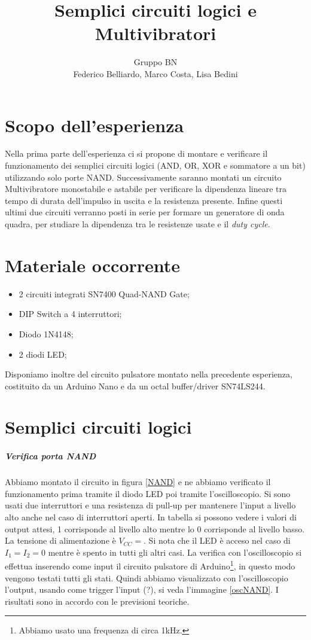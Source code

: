 \documentclass[10pt,a4paper]{article}
\author{Gruppo BN \\ Federico Belliardo, Marco Costa, Lisa Bedini}
\title{Semplici circuiti logici e Multivibratori}
\begin{document}
\maketitle
\section{Scopo dell'esperienza}
Nella prima parte dell'esperienza ci si propone di montare e verificare il funzionamento dei semplici circuiti logici (AND, OR, XOR e sommatore a un bit) utilizzando solo porte NAND. Successivamente saranno montati un circuito Multivibratore monostabile e astabile per verificare la dipendenza lineare tra tempo di durata dell'impulso in uscita e la resistenza presente. Infine questi ultimi due circuiti verranno posti in serie per formare un generatore di onda quadra, per studiare la dipendenza tra le resistenze usate e il \emph{duty cycle}.

\section{Materiale occorrente}
\begin{itemize}
\item 2 circuiti integrati SN7400 Quad-NAND Gate;
\item DIP Switch a 4 interruttori;
\item Diodo 1N4148;
\item 2 diodi LED;
\end{itemize}
Disponiamo inoltre del circuito pulsatore montato nella precedente esperienza, costituito da un Arduino Nano e da un octal buffer/driver SN74LS244.

\section{Semplici circuiti logici}
\subparagraph{Verifica porta NAND}
Abbiamo montato il circuito in figura \ref{NAND} e ne abbiamo verificato il funzionamento prima tramite il diodo LED poi tramite l'oscilloscopio. Si sono usati due interruttori e una resistenza di pull-up per mantenere l'input a livello alto anche nel caso di interruttori aperti. In tabella  si possono vedere i valori di output attesi, 1 corrisponde al livello alto mentre lo 0 corrisponde al livello basso. La tensione di alimentazione è $V_{CC}= $. Si nota che il LED è acceso nel caso di $I_1=I_2=0$ mentre è spento in tutti gli altri casi. La verifica con l'oscilloscopio si effettua inserendo come input il circuito pulsatore di Arduino\footnote{Abbiamo usato una frequenza di circa 1kHz.}, in questo modo vengono testati tutti gli stati. Quindi abbiamo visualizzato con l'oscilloscopio l'output, usando come trigger l'input (?), si veda l'immagine \ref{oscNAND}. I risultati sono in accordo con le previsioni teoriche.
\end{document}
